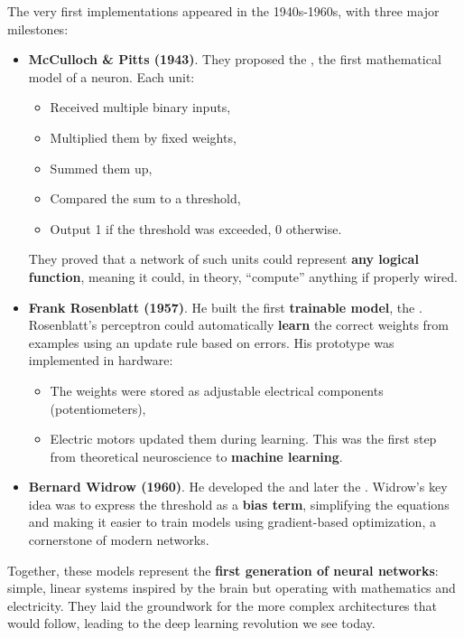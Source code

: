 \noindent
The very first implementations appeared in the 1940s-1960s, with three major milestones:
\begin{itemize}
    \item[\textcolor{Green3}{\faIcon{puzzle-piece}}] \textcolor{Green3}{\textbf{McCulloch \& Pitts (1943)}}. They proposed the , the first mathematical model of a neuron. Each unit:
    \begin{itemize}
        \item Received multiple binary inputs,
        \item Multiplied them by fixed weights,
        \item Summed them up,
        \item Compared the sum to a threshold,
        \item Output 1 if the threshold was exceeded, 0 otherwise.
    \end{itemize}
    They proved that a network of such units could represent \textbf{any logical function}, meaning it could, in theory, ``compute'' anything if properly wired.
    \item[\textcolor{Green3}{\faIcon{\speedIcon}}] \textcolor{Green3}{\textbf{Frank Rosenblatt (1957)}}. He built the first \textbf{trainable model}, the . Rosenblatt's perceptron could automatically \textbf{learn} the correct weights from examples using an update rule based on errors. His prototype was implemented in hardware:
    \begin{itemize}
        \item The weights were stored as adjustable electrical components (potentiometers),
        \item Electric motors updated them during learning. This was the first step from theoretical neuroscience to \textbf{machine learning}.
    \end{itemize}
    \item[\textcolor{Green3}{\faIcon{tools}}] \textcolor{Green3}{\textbf{Bernard Widrow (1960)}}. He developed the  and later the . Widrow's key idea was to express the threshold as a \textbf{bias term}, simplifying the equations and making it easier to train models using gradient-based optimization, a cornerstone of modern networks.
\end{itemize}
Together, these models represent the \textbf{first generation of neural networks}: simple, linear systems inspired by the brain but operating with mathematics and electricity. They laid the groundwork for the more complex architectures that would follow, leading to the deep learning revolution we see today.